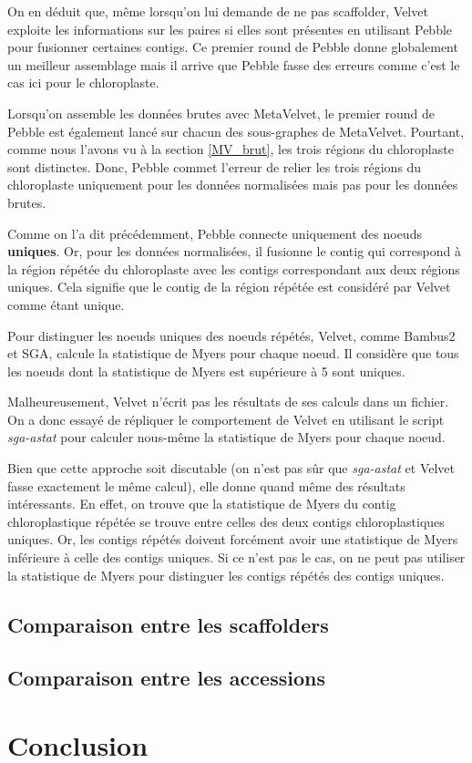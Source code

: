 \documentclass[a4paper]{article}
\begin{document}
On en déduit que, même lorsqu'on lui demande de ne pas scaffolder, Velvet exploite les informations sur les paires si elles sont présentes en utilisant Pebble pour fusionner certaines contigs. Ce premier round de Pebble donne globalement un meilleur assemblage mais il arrive que Pebble fasse des erreurs comme c'est le cas ici pour le chloroplaste. 

Lorsqu'on assemble les données brutes avec MetaVelvet, le premier round de Pebble est également lancé sur chacun des sous-graphes de MetaVelvet. Pourtant, comme nous l'avons vu à la section \ref{MV_brut}, les trois régions du chloroplaste sont distinctes. Donc, Pebble commet l'erreur de relier les trois régions du chloroplaste uniquement pour les données normalisées mais pas pour les données brutes. 

Comme on l'a dit précédemment, Pebble connecte uniquement des noeuds \textbf{uniques}. Or, pour les données normalisées, il fusionne le contig qui correspond à la région répétée du chloroplaste avec les contigs correspondant aux deux régions uniques. Cela signifie que le contig de la région répétée est considéré par Velvet comme étant unique.

Pour distinguer les noeuds uniques des noeuds répétés, Velvet, comme Bambus2 et SGA, calcule la statistique de Myers pour chaque noeud. Il considère que tous les noeuds dont la statistique de Myers est supérieure à 5 sont uniques. \cite{velvetcode}

Malheureusement, Velvet n'écrit pas les résultats de ses calculs dans un fichier. On a donc essayé de répliquer le comportement de Velvet en utilisant le script \textit{sga-astat} pour calculer nous-même la statistique de Myers pour chaque noeud. 

Bien que cette approche soit discutable (on n'est pas sûr que \textit{sga-astat} et Velvet fasse exactement le même calcul), elle donne quand même des résultats intéressants. En effet, on trouve que la statistique de Myers du contig chloroplastique répétée se trouve entre celles des deux contigs chloroplastiques uniques. Or, les contigs répétés doivent forcément avoir une statistique de Myers inférieure à celle des contigs uniques. Si ce n'est pas le cas, on ne peut pas utiliser la statistique de Myers pour distinguer les contigs répétés des contigs uniques. 




\subsection{Comparaison entre les scaffolders}

\subsection{Comparaison entre les accessions}

\section{Conclusion}







\end{document}
